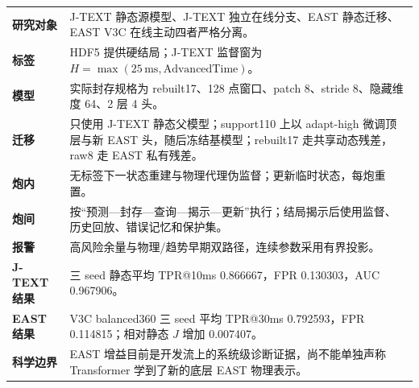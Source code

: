 \documentclass[11pt,a4paper]{article}
\begin{document}
\begin{tabularx}{\textwidth}{>{\bfseries}p{30mm}Y}
研究对象 & J-TEXT 静态源模型、J-TEXT 独立在线分支、EAST 静态迁移、EAST V3C 在线主动四者严格分离。\\
标签 & HDF5 提供硬结局；J-TEXT 监督窗为 \(H=\max(25\,\mathrm{ms},\mathrm{AdvancedTime})\)。\\
模型 & 实际封存规格为 rebuilt17、128 点窗口、patch 8、stride 8、隐藏维度 64、2 层 4 头。\\
迁移 & 只使用 J-TEXT 静态父模型；support110 上以 adapt-high 微调顶层与新 EAST 头，随后冻结基模型；rebuilt17 走共享动态残差，raw8 走 EAST 私有残差。\\
炮内 & 无标签下一状态重建与物理代理伪监督；更新临时状态，每炮重置。\\
炮间 & 按“预测—封存—查询—揭示—更新”执行；结局揭示后使用监督、历史回放、错误记忆和保护集。\\
报警 & 高风险余量与物理/趋势早期双路径，连续参数采用有界投影。\\
J-TEXT 结果 & 三 seed 静态平均 TPR@10ms 0.866667，FPR 0.130303，AUC 0.967906。\\
EAST 结果 & V3C balanced360 三 seed 平均 TPR@30ms 0.792593，FPR 0.114815；相对静态 \(J\) 增加 0.007407。\\
科学边界 & EAST 增益目前是开发流上的系统级诊断证据，尚不能单独声称 Transformer 学到了新的底层 EAST 物理表示。\\
\end{tabularx}
\end{document}
